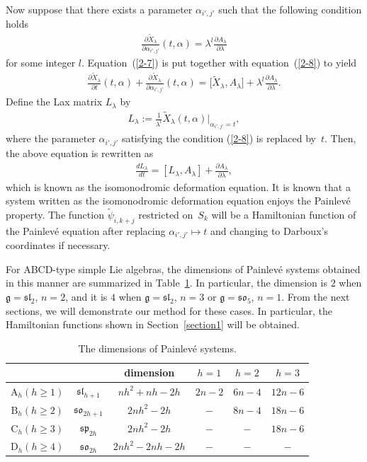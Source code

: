 \documentclass[10pt,a4paper]{amsart}
\numberwithin{equation}{section}
\begin{document}
Now suppose that there exists a parameter $\alpha _{i',j'}$ such that the following condition holds
\begin{gather}
\frac{\partial \widetilde{X}_\lambda }{\partial \alpha _{i',j'}}(t, \alpha ) = \lambda ^l \frac{\partial A_\lambda }{\partial \lambda}\label{2-8}
\end{gather}
for some integer $l$. Equation~(\ref{2-7}) is put together with equation~(\ref{2-8}) to yield
\begin{gather*}
\frac{\partial \widetilde{X}_\lambda}{\partial t}(t,\alpha ) + \frac{\partial \widetilde{X}_\lambda }{\partial \alpha _{i',j'}}(t, \alpha )
 = \big[\widetilde{X}_\lambda , A_\lambda \big]+\lambda ^l \frac{\partial A_\lambda }{\partial \lambda }.
\end{gather*}
Def\/ine the Lax matrix $L_\lambda $ by
\begin{gather*}
L_\lambda := \frac{1}{\lambda ^l} \widetilde{X}_\lambda (t, \alpha )|_{\alpha _{i',j'} = t},
\end{gather*}
where the parameter $\alpha _{i',j'}$ satisfying the condition (\ref{2-8}) is replaced by~$t$. Then, the above equation is rewritten as
\begin{gather}
\frac{dL_\lambda}{dt} = [L_\lambda , A_\lambda ]+\frac{\partial A_\lambda }{\partial \lambda },
\label{2-9}
\end{gather}
which is known as the isomonodromic deformation equation. It is known that a system written as the isomonodromic deformation equation enjoys the Painlev\'{e} property. The function $\widetilde{\psi}_{i,k+j}$ restricted on~$S_k$ will be a Hamiltonian function of the Painlev\'{e} equation after replacing $\alpha _{i',j'} \mapsto t$ and changing to Darboux's coordinates if necessary.

For ABCD-type simple Lie algebras, the dimensions of Painlev\'{e} systems obtained in this manner are summarized in Table~\ref{table3}. In particular, the dimension is $2$ when $\mathfrak{g} = \mathfrak{sl}_2$, $n=2$, and it is $4$ when $\mathfrak{g} = \mathfrak{sl}_2$, $n=3$ or $\mathfrak{g} = \mathfrak{so}_5$, $n=1$. From the next sections, we will demonstrate our method for these cases. In particular, the Hamiltonian functions shown in Section~\ref{section1} will be obtained.

\begin{table}[h]\centering\caption{The dimensions of Painlev\'{e} systems.}\label{table3}\vspace{1mm}
\begin{tabular}{|c|c|c|c|c|c|} \hline
& & dimension & $h=1$ & $h=2$ & $h=3$\\ \hline \hline
$\text{A}_h (h\geq 1)$ & $\mathfrak{sl}_{h+1}$ & $nh^2+nh-2h$ & $2n-2$ & $6n-4$ & $12n-6$ \\ \hline
$\text{B}_h (h\geq 2)$ & $\mathfrak{so}_{2h+1}$& $2nh^2-2h$ & $-$ & $8n-4$ & $18n-6$\\ \hline
$\text{C}_h (h\geq 3)$ & $\mathfrak{sp}_{2h}$ & $2nh^2-2h$ & $-$ & $-$ & $18n-6$ \\ \hline
$\text{D}_h (h\geq 4)$ & $\mathfrak{so}_{2h}$ & $2nh^2-2nh-2h$ & $-$ & $-$ & $-$ \\ \hline
\end{tabular}
\end{table}
\end{document}
